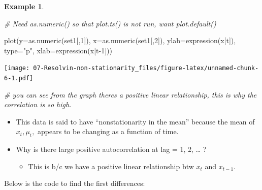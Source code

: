 \documentclass[
]{book}
\newenvironment{Shaded}{\begin{snugshade}}{\end{snugshade}}
\newcommand{\AttributeTok}[1]{\textcolor[rgb]{0.77,0.63,0.00}{#1}}
\newcommand{\CommentTok}[1]{\textcolor[rgb]{0.56,0.35,0.01}{\textit{#1}}}
\newcommand{\DecValTok}[1]{\textcolor[rgb]{0.00,0.00,0.81}{#1}}
\newcommand{\FunctionTok}[1]{\textcolor[rgb]{0.00,0.00,0.00}{#1}}
\newcommand{\NormalTok}[1]{#1}
\newcommand{\OtherTok}[1]{\textcolor[rgb]{0.56,0.35,0.01}{#1}}
\newcommand{\SpecialCharTok}[1]{\textcolor[rgb]{0.00,0.00,0.00}{#1}}
\newcommand{\StringTok}[1]{\textcolor[rgb]{0.31,0.60,0.02}{#1}}
\providecommand{\tightlist}{%
  \setlength{\itemsep}{0pt}\setlength{\parskip}{0pt}}
\theoremstyle{definition}
\theoremstyle{definition}
\newtheorem{example}{Example}[chapter]
\theoremstyle{definition}
\theoremstyle{definition}
\theoremstyle{remark}
\begin{document}
\begin{example}
\begin{Shaded}
\begin{Highlighting}[]
\CommentTok{\# Need as.numeric() so that plot.ts() is not run, want plot.default()}

\FunctionTok{plot}\NormalTok{(}\AttributeTok{y=}\FunctionTok{as.numeric}\NormalTok{(set1[,}\DecValTok{1}\NormalTok{]), }\AttributeTok{x=}\FunctionTok{as.numeric}\NormalTok{(set1[,}\DecValTok{2}\NormalTok{]), }\AttributeTok{ylab=}\FunctionTok{expression}\NormalTok{(x[t]), }\AttributeTok{type=}\StringTok{"p"}\NormalTok{, }\AttributeTok{xlab=}\FunctionTok{expression}\NormalTok{(x[t}\DecValTok{{-}1}\NormalTok{]))}
\end{Highlighting}
\end{Shaded}

\texttt{[image: 07-Resolvin-non-stationarity\_files/figure-latex/unnamed-chunk-6-1.pdf]}

\begin{Shaded}
\begin{Highlighting}[]
\CommentTok{\# you can see from the graph there\textquotesingle{}s a positive linear relationship, this is why the correlation is so high.}
\end{Highlighting}
\end{Shaded}

\end{example}

\begin{itemize}
\tightlist
\item
  This data is said to have ``nonstationarity in the mean'' because the mean of \(x_t, \mu_t,\) appears to be changing as a function of time.
\item
  Why is there large positive autocorrelation at lag = 1, 2, \ldots{} ?

  \begin{itemize}
  \tightlist
  \item
    This is b/c we have a positive linear relationship btw \(x_t\) and \(x_{t-1}\).
  \end{itemize}
\end{itemize}

Below is the code to find the first differences:

\begin{Shaded}
\end{Shaded}
\end{document}
